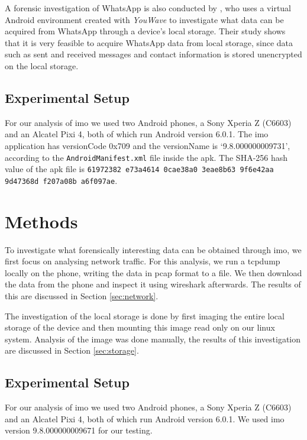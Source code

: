 \documentclass[conference]{IEEEtran}
\begin{document}
A forensic investigation of WhatsApp is also conducted by
\citeauthor{anglano2014forensic} \cite{anglano2014forensic}, who uses a virtual
Android environment created with {\it YouWave} to investigate what data can be
acquired from WhatsApp through a device's local storage. Their study shows that
it is very feasible to acquire WhatsApp data from local storage, since data such
as sent and received messages and contact information is stored unencrypted on
the local storage.

\subsection{Experimental Setup}\label{sec:setup}

For our analysis of imo we used two Android phones, a Sony Xperia Z (C6603) and
an Alcatel Pixi 4, both of which run Android version 6.0.1. The imo application
has versionCode 0x709 and the versionName is `9.8.000000009731', according to
the \texttt{AndroidManifest.xml} file inside the apk. The SHA-256 hash value of
the apk file is \texttt{61972382 e73a4614 0cae38a0 3eae8b63 9f6e42aa 9d47368d
f207a08b a6f097ae}.


\section{Methods}\label{sec:method}

To investigate what forensically interesting data can be obtained through imo,
we first focus on analysing network traffic. For this analysis, we run a tcpdump
locally on the phone, writing the data in pcap format to a file. We then download
the data from the phone and inspect it using wireshark afterwards. The
results of this are discussed in Section \ref{sec:network}.

The investigation of the local storage is done by first imaging the entire local
storage of the device and then mounting this image read only on our linux
system. Analysis of the image was done manually, the results of this
investigation are discussed in Section \ref{sec:storage}.


\subsection{Experimental Setup}

For our analysis of imo we used two Android phones, a Sony Xperia Z (C6603) and
an Alcatel Pixi 4, both of which run Android version 6.0.1. We used imo
version 9.8.000000009671 for our testing.
\end{document}
